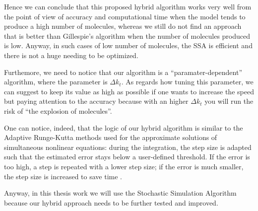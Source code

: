 \documentclass[12pt,a4paper]{report}
\begin{document}
Hence we can conclude that this proposed hybrid algorithm works very well from the point of view of accuracy and computational time when the model tends to produce a high number of molecules, whereas we still do not find an approach that is better than Gillespie's algorithm when the number of molecules produced is low. Anyway, in such cases of low number of molecules, the SSA is efficient and there is not a huge needing to be optimized.%

Furthemore, we need to notice that our algorithm is a ``paramater-dependent'' algorithm, where the parameter is $\Delta k_{t}$. As regards how tuning this parameter, we can suggest to keep its value as high as possible if one wants to increase the speed but paying attention to the accuracy because with an higher $\Delta k_{t}$ you will run the risk of ``the explosion of molecules''. 

One can notice, indeed, that the logic of our hybrid algorithm is similar to the Adaptive Runge-Kutta methods used for the approximate solutions of simultaneous nonlinear equations: during the integration, the step size is adapted such that the estimated error stays below a user-defined threshold. If the error is too high, a step is repeated with a lower step size; if the error is much smaller, the step size is increased to save time \cite{RungeKutta}.

Anyway, in this thesis work we will use the Stochastic Simulation Algorithm because our hybrid approach needs to be further tested and improved.





\end{document}
